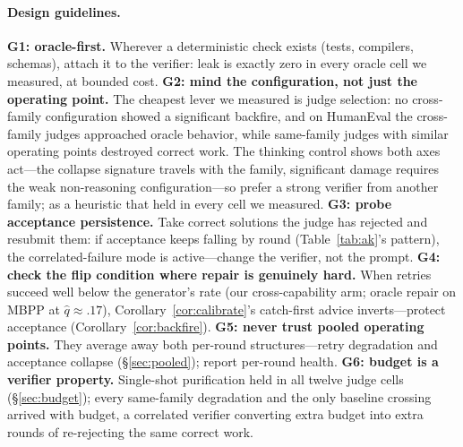 \documentclass[10pt]{article}
\begin{document}
\paragraph{Design guidelines.}
\textbf{G1: oracle-first.}  Wherever a deterministic check exists
(tests, compilers, schemas), attach it to the verifier: leak is
exactly zero in every oracle cell we measured, at bounded cost.
\textbf{G2: mind the configuration, not just the operating
point.}  The cheapest lever we measured is judge selection: no
cross-family configuration showed a significant backfire, and on
HumanEval the cross-family judges approached oracle behavior,
while same-family judges with similar operating points destroyed
correct work.  The thinking control shows both axes act---the
collapse signature travels with the family, significant damage
requires the weak non-reasoning configuration---so prefer a
strong verifier from another family; as a heuristic that held in
every cell we measured.  \textbf{G3: probe acceptance
persistence.}  Take correct solutions the judge has rejected and
resubmit them: if acceptance keeps falling by round
(Table~\ref{tab:ak}'s pattern), the correlated-failure mode is
active---change the verifier, not the prompt.  \textbf{G4: check the flip condition
where repair is genuinely hard.}  When retries succeed well below
the generator's rate (our cross-capability arm; oracle repair on
MBPP at $\hat q \approx .17$), Corollary~\ref{cor:calibrate}'s
catch-first advice inverts---protect acceptance
(Corollary~\ref{cor:backfire}).  \textbf{G5: never trust pooled operating points.}
They average away both per-round structures---retry degradation
and acceptance collapse (§\ref{sec:pooled}); report per-round
health.  \textbf{G6: budget is a verifier property.}
Single-shot purification held in all twelve judge cells
(§\ref{sec:budget}); every same-family degradation and the only
baseline crossing arrived with budget, a correlated verifier
converting extra budget into extra rounds of re-rejecting the
same correct work.
\end{document}
